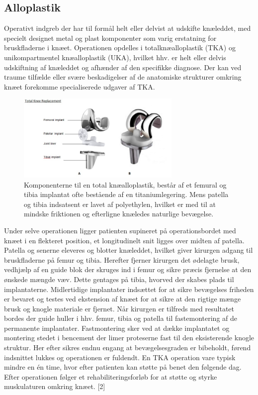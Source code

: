 \subsection{Alloplastik}
Operativt indgreb der har til formål helt eller delvist at udskifte knæleddet, med specielt designet metal og plast komponenter som varig erstatning for bruskfladerne i knæet. Operationen opdelles i totalknæalloplastik (TKA) og unikompartmentel knæalloplastik (UKA), hvilket hhv. er helt eller delvis udskiftning af knæleddet og afhænder af den specifikke diagnose. Der kan ved traume tilfælde eller svære beskadigelser af de anatomiske strukturer omkring knæet forekomme specialiserede udgaver af TKA.

\begin{figure}[H] 
\begin{center}
\includegraphics[width=0.7\textwidth]{figures/tka_implant}
\end{center}
\caption{Komponenterne til en total knæalloplastik, består af et femural og tibia implantat ofte bestående af en titaniumlegering. Mens patella og tibia indsatsent er lavet af polyethylen, hvilket er med til at mindske friktionen og efterligne knæledes naturlige bevægelse.\cite{1}} 
\label{fig:tka_implant} 
\end{figure}

Under selve operationen ligger patienten supineret på operationsbordet med knæet i en flekteret position, et longitudinelt snit ligges over midten af patella. Patella og senerne eleveres og blotter knæleddet, hvilket giver kirurgen adgang til bruskfladerne på femur og tibia. Herefter fjerner kirurgen det ødelagte brusk, vedhjælp af en guide blok der skruges ind i femur og sikre præcis fjernelse at den ønskede mængde væv. Dette gentages på tibia, hvorved der skabes plads til implantaterne. Midlertidige implantater indsættet for at sikre bevægelses friheden er bevaret og testes ved ekstension af knæet for at sikre at den rigtige mænge brusk og knogle materiale er fjernet. Når kirurgen er tilfreds med resultatet bordes der guide huller i hhv. femur, tibia og patella til fastemontering af de permanente implantater. Fastmontering sker ved at dække implantatet og montering stedet i bencement der limer proteserne fast til den eksisterende knogle struktur. Her efter sikres endnu engang at bevægelsesgraden er bibeholdt, førend indsnittet lukkes og operationen er fuldendt. En TKA operation vare typisk mindre en én time, hvor efter patienten kan støtte på benet den følgende dag. Efter operationen følger et rehabiliteringsforløb for at støtte og styrke muskulaturen omkring knæet. [2]

